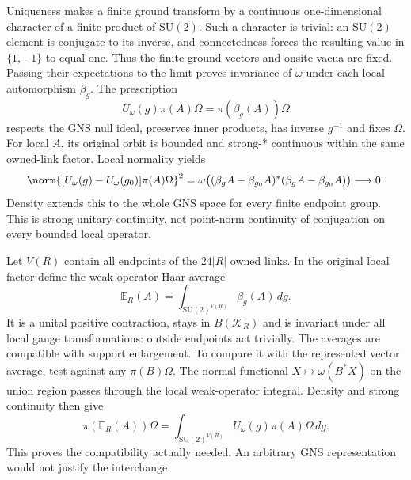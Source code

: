 Uniqueness makes a finite ground transform by a continuous one-dimensional character of a finite product of $\mathrm{SU}(2)$. Such a character is trivial: an $\mathrm{SU}(2)$ element is conjugate to its inverse, and connectedness forces the resulting value in $\{1,-1\}$ to equal one. Thus the finite ground vectors and onsite vacua are fixed. Passing their expectations to the limit proves invariance of $\omega$ under each local automorphism $\beta_g$. The prescription
\begin{equation}
 U_\omega(g)\pi(A)\Omega=\pi(\beta_g(A))\Omega
 \label{r28:eq:aj1-gauge}
\end{equation}
respects the GNS null ideal, preserves inner products, has inverse $g^{-1}$ and fixes $\Omega$. For local $A$, its original orbit is bounded and strong-* continuous within the same owned-link factor. Local normality yields
\begin{equation}
 \norm{[U_\omega(g)-U_\omega(g_0)]\pi(A)\Omega}^2
 =\omega\big((\beta_gA-\beta_{g_0}A)^*(\beta_gA-\beta_{g_0}A)\big)
 \longrightarrow0.
\end{equation}
Density extends this to the whole GNS space for every finite endpoint group. This is strong unitary continuity, not point-norm continuity of conjugation on every bounded local operator.

Let $V(R)$ contain all endpoints of the $24|R|$ owned links. In the original local factor define the weak-operator Haar average
\begin{equation}
 \mathbb E_R(A)=\int_{\mathrm{SU}(2)^{V(R)}}\beta_g(A)\,dg.
\end{equation}
It is a unital positive contraction, stays in $B(\mathcal K_R)$ and is invariant under all local gauge transformations: outside endpoints act trivially. The averages are compatible with support enlargement. To compare it with the represented vector average, test against any $\pi(B)\Omega$. The normal functional $X\mapsto\omega(B^*X)$ on the union region passes through the local weak-operator integral. Density and strong continuity then give
\begin{equation}
 \pi(\mathbb E_R(A))\Omega
 =\int_{\mathrm{SU}(2)^{V(R)}}U_\omega(g)\pi(A)\Omega\,dg.
 \label{r28:eq:aj1-average}
\end{equation}
This proves the compatibility actually needed. An arbitrary GNS representation would not justify the interchange.

